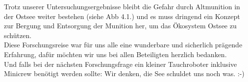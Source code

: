 Trotz unserer Untersuchungsergebnisse bleibt die Gefahr durch Altmunition in der Ostsee weiter bestehen (siehe Abb 4.1.) und es muss dringend ein Konzept zur Bergung und Entsorgung der Munition her, um das Ökosystem Ostsee zu schützen.\\

Diese Forschungsreise war für uns alle eine wunderbare und sicherlich prägende Erfahrung, dafür möchten wir uns bei allen Beteiligten herzlich bedanken.\\

Und falls bei der nächsten Forschungsfrage ein kleiner Tauchroboter inklusive Minicrew benötigt werden sollte: Wir denken, die See schuldet uns noch was. :-)




